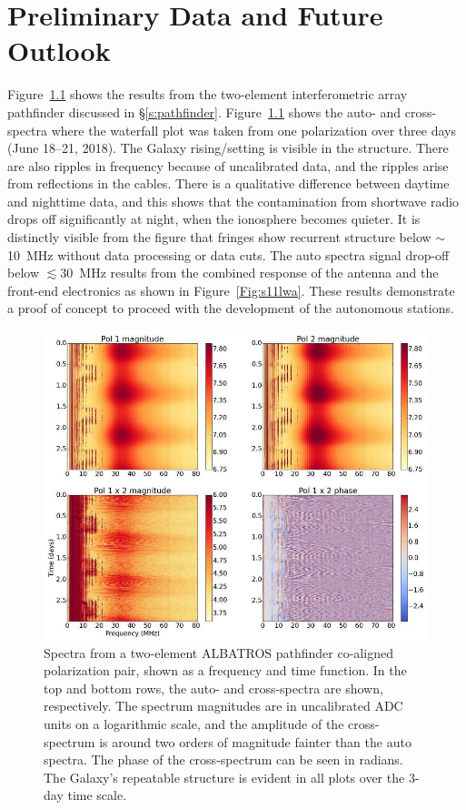\chapter{Preliminary Data and Future Outlook}\label{s:Prel}

Figure~\ref{Fig:pathfinderresults} shows the results from the two-element interferometric array pathfinder discussed in \S\ref{s:pathfinder}. Figure~\ref{Fig:pathfinderresults} shows the auto- and cross- spectra where the waterfall plot was taken from one polarization over three days (June 18–21, 2018). The Galaxy rising/setting is visible in the structure. There are also ripples in frequency because of uncalibrated data, and the ripples arise from reflections in the cables. There is a qualitative difference between daytime and nighttime data, and this shows that the contamination from shortwave radio drops off significantly at night, when the ionosphere becomes quieter. It is distinctly visible from the figure that fringes show recurrent structure below $\sim$ \SI{10}{\mega\hertz} without data processing or data cuts. The auto spectra signal drop-off below $\lesssim$\SI{ 30}{\mega\hertz} results from the combined response of the antenna and the front-end electronics as shown in Figure~\ref{Fig:s11lwa}. These results demonstrate a proof of concept to proceed with the development of the autonomous stations.

\begin{figure}
	\centering
	\includegraphics[width=0.9\linewidth]{"Figures/pathfinder_results"}
	\caption{Spectra from a two-element ALBATROS pathfinder co-aligned polarization pair, shown as a frequency and time function. In the top and bottom rows, the auto- and cross-spectra are shown, respectively. The spectrum magnitudes are in uncalibrated ADC units on a logarithmic scale, and the amplitude of the cross-spectrum is around two orders of magnitude fainter than the auto spectra. The phase of the cross-spectrum can be seen in radians. The Galaxy's repeatable structure is evident in all plots over the 3-day time scale.}
	\label{Fig:pathfinderresults}
\end{figure}

